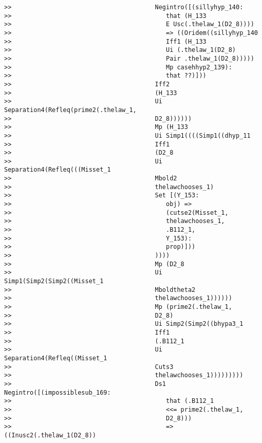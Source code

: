 \documentclass[12pt]{article}
\begin{document}
\begin{verbatim}
>>                                       Negintro([(sillyhyp_140:
>>                                          that (H_133
>>                                          E Usc(.thelaw_1(D2_8))))
>>                                          => ((Oridem((sillyhyp_140
>>                                          Iff1 (H_133
>>                                          Ui (.thelaw_1(D2_8)
>>                                          Pair .thelaw_1(D2_8)))))
>>                                          Mp casehhyp2_139):
>>                                          that ??)]))
>>                                       Iff2
>>                                       (H_133
>>                                       Ui Separation4(Refleq(prime2(.thelaw_1,
>>                                       D2_8))))))
>>                                       Mp (H_133
>>                                       Ui Simp1((((Simp1((dhyp_11
>>                                       Iff1
>>                                       (D2_8
>>                                       Ui Separation4(Refleq(((Misset_1
>>                                       Mbold2
>>                                       thelawchooses_1)
>>                                       Set [(Y_153:
>>                                          obj) =>
>>                                          (cutse2(Misset_1,
>>                                          thelawchooses_1,
>>                                          .B112_1,
>>                                          Y_153):
>>                                          prop)]))
>>                                       ))))
>>                                       Mp (D2_8
>>                                       Ui Simp1(Simp2(Simp2((Misset_1
>>                                       Mboldtheta2
>>                                       thelawchooses_1))))))
>>                                       Mp (prime2(.thelaw_1,
>>                                       D2_8)
>>                                       Ui Simp2(Simp2((bhypa3_1
>>                                       Iff1
>>                                       (.B112_1
>>                                       Ui Separation4(Refleq((Misset_1
>>                                       Cuts3
>>                                       thelawchooses_1)))))))))
>>                                       Ds1 Negintro([(impossiblesub_169:
>>                                          that (.B112_1
>>                                          <<= prime2(.thelaw_1,
>>                                          D2_8)))
>>                                          => ((Inusc2(.thelaw_1(D2_8))

\end{verbatim}
\end{document}
